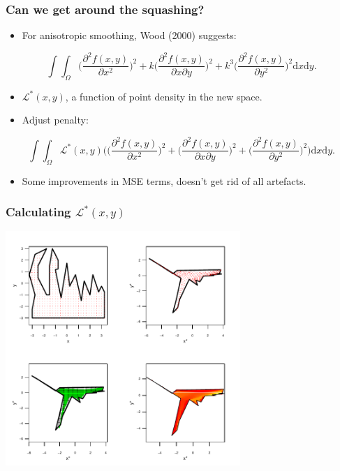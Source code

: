 \documentclass[ignorenonframetext]{beamer} %
\newcommand{\bi}{\begin{itemize}}
\newcommand{\ei}{\end{itemize}}
\begin{document}
\begin{frame}
	\frametitle{Can we get around the squashing?}
		\bi
			\item For anisotropic smoothing, Wood (2000) suggests: 
		\ei
		\begin{equation*}
            \int\int_\Omega \Big(\frac{\partial^2 f(x,y)}{\partial x^2}\Big)^2 + k\Big(\frac{\partial^2 f(x,y)}{\partial x \partial y}\Big)^2 + k^3 \Big(\frac{\partial^2 f(x,y)}{\partial y^2}\Big)^2 \text{d}x\text{d}y.
            \end{equation*}
		\bi
			\item $\mathcal{L}^*(x,y)$, a function of point density in the new space.
              \item Adjust penalty:
          \ei
            \begin{equation*}
	            \int\int_\Omega \mathcal{L}^*(x,y) \Big( \Big(\frac{\partial^2 f(x,y)}{\partial x^2}\Big)^2 + \Big(\frac{\partial^2 f(x,y)}{\partial x \partial y}\Big)^2 + \Big(\frac{\partial^2 f(x,y)}{\partial y^2}\Big)^2\Big) \text{d}x\text{d}y.
            \end{equation*}
           \bi
           	\item Some improvements in MSE terms, doesn't get rid of all artefacts.
		\ei
\end{frame}

\begin{frame}
	\frametitle{Calculating $\mathcal{L}^*(x,y)$}
	\centering
              \includegraphics[height=3.5in]{figs/densgrid.pdf}
\end{frame}
\end{document}
